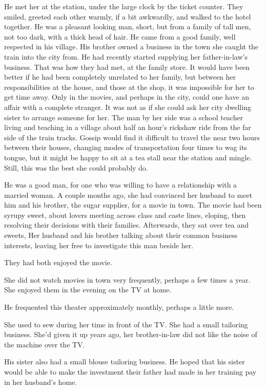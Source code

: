 \documentclass{article}
\begin{document}
He met her at the station, under the large clock by the ticket counter. They smiled, greeted each other warmly, if a bit awkwardly, and walked to the hotel together. He was a pleasant looking man, short, but from a family of tall men, not too dark, with a thick head of hair. He came from a good family, well respected in his village. His brother owned a business in the town she caught the train into the city from. He had recently started supplying her father-in-law's business. That was how they had met, at the family store. It would have been better if he had been completely unrelated to her family, but between her responsibilities at the house, and those at the shop, it was impossible for her to get time away. Only in the movies, and perhaps in the city, could one have an affair with a complete stranger. It was not as if she could ask her city dwelling sister to arrange someone for her. The man by her side was a school teacher living and teaching in a village about half an hour's rickshaw ride from the far side of the train tracks. Gossip would find it difficult to travel the near two hours between their houses, changing modes of transportation four times to wag its tongue, but it might be happy to sit at a tea stall near the station and mingle. Still, this was the best she could probably do.

He was a good man, for one who was willing to have a relationship with a married woman. A couple months ago, she had convinced her husband to meet him and his brother, the sugar supplier, for a movie in town. The movie had been syrupy sweet, about lovers meeting across class and caste lines, eloping, then resolving their decisions with their families. Afterwards, they sat over tea and sweets, Her husband and his brother talking about their common business interests, leaving her free to investigate this man beside her. 

They had both enjoyed the movie. 

She did not watch movies in town very frequently, perhaps a few times a year. She enjoyed them in the evening on the TV at home. 

He frequented this theater approximately monthly, perhaps a little more. 

She used to sew during her time in front of the TV. She had a small tailoring business. She'd given it up years ago, her brother-in-law did not like the noise of the machine over the TV.

His sister also had a small blouse tailoring business. He hoped that his sister would be able to make the investment their father had made in her training pay in her husband's home.
\end{document}
